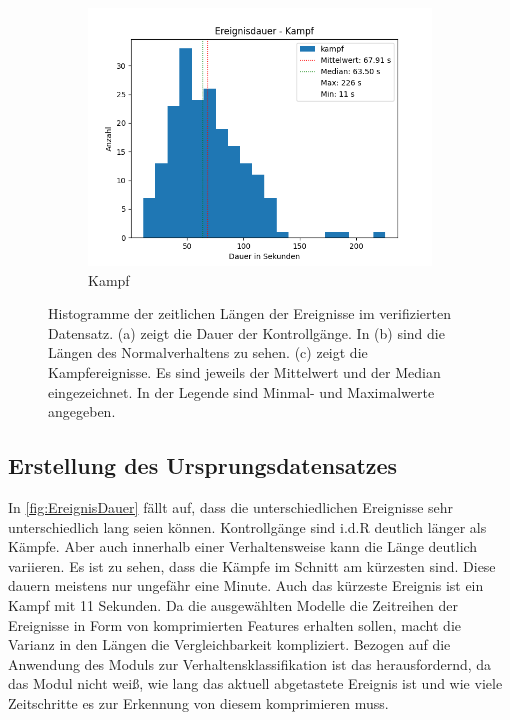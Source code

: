 \begin{figure}[htbp]
    \begin{subfigure}{.6\textwidth}
        \centering
        \includegraphics[width=1\linewidth]{img//Ereignisdauer/Auswertung Ereignisdauer kampf.png}
        \caption{Kampf}
        \label{fig:DauerNormal}
    \end{subfigure}
    \caption[Histogramme der zeitlichen Längen der Ereignisse im verifizierten Datensatz.]{Histogramme der zeitlichen Längen der Ereignisse im verifizierten Datensatz. (a) zeigt die Dauer der Kontrollgänge. In (b) sind die Längen des Normalverhaltens zu sehen. (c) zeigt die Kampfereignisse. Es sind jeweils der Mittelwert und der Median eingezeichnet. In der Legende sind Minmal- und Maximalwerte angegeben.}
    \label{fig:EreignisDauer}
\end{figure}

\subsection{Erstellung des Ursprungsdatensatzes}
In \autoref{fig:EreignisDauer} fällt auf, dass die unterschiedlichen Ereignisse sehr unterschiedlich lang seien können. Kontrollgänge sind i.d.R deutlich länger als Kämpfe. Aber auch innerhalb einer Verhaltensweise kann die Länge deutlich variieren. Es ist zu sehen, dass die Kämpfe im Schnitt am kürzesten sind. Diese dauern meistens nur ungefähr eine Minute. Auch das kürzeste Ereignis ist ein Kampf mit 11 Sekunden. Da die ausgewählten Modelle die Zeitreihen der Ereignisse in Form von komprimierten Features erhalten sollen, macht die Varianz in den Längen die Vergleichbarkeit kompliziert. Bezogen auf die Anwendung des Moduls zur Verhaltensklassifikation ist das herausfordernd, da das Modul nicht weiß, wie lang das aktuell abgetastete Ereignis ist und wie viele Zeitschritte es zur Erkennung von diesem komprimieren muss. \par

